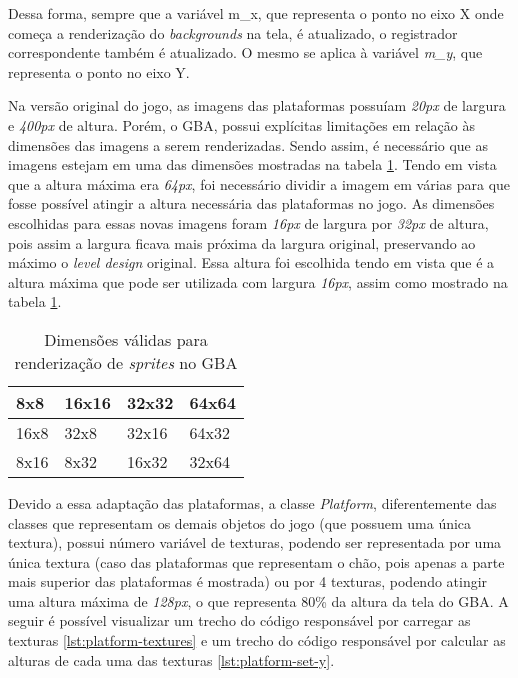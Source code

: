 Dessa forma, sempre que a variável m\_x, que representa o ponto no eixo X onde começa a renderização do \textit{backgrounds} na tela, é atualizado, o registrador correspondente também é atualizado. O mesmo se aplica à variável \textit{m\_y}, que representa o ponto no eixo Y.
 
Na versão original do jogo, as imagens das plataformas possuíam \textit{20px} de largura e \textit {400px} de altura. Porém, o GBA, possui explícitas limitações em relação às dimensões das imagens a serem renderizadas. Sendo assim, é necessário que as imagens estejam em uma das dimensões mostradas na tabela \ref{table:sprite-sizes}. Tendo em vista que a altura máxima era \textit{64px}, foi necessário dividir a imagem em várias para que fosse possível atingir a altura necessária das plataformas no jogo. As dimensões escolhidas para essas novas imagens foram \textit{16px} de largura por \textit{32px} de altura, pois assim a largura ficava mais próxima da largura original, preservando ao máximo o \textit{level design} original. Essa altura foi escolhida tendo em vista que é a altura máxima que pode ser utilizada com largura \textit{16px}, assim como mostrado na tabela \ref{table:sprite-sizes}.

\begin{table}[htb]
\center
\begin{tabular}{|l|l|l|l|}
\hline
8x8  & 16x16 & 32x32 & 64x64 \\ \hline
16x8 & 32x8  & 32x16 & 64x32 \\ \hline
8x16 & 8x32  & 16x32 & 32x64 \\ \hline
\end{tabular}
\caption{Dimensões válidas para renderização de \textit{sprites} no GBA}
\label{table:sprite-sizes}
\end{table}

Devido a essa adaptação das plataformas, a classe \textit{Platform}, diferentemente das classes que representam os demais objetos do jogo (que possuem uma única textura), possui número variável de texturas, podendo ser representada por uma única textura (caso das plataformas que representam o chão, pois apenas a parte mais superior das plataformas é mostrada) ou por 4 texturas, podendo atingir uma altura máxima de \textit{128px}, o que representa 80\% da altura da tela do GBA. A seguir é possível visualizar um trecho do código responsável por carregar as texturas \ref{lst:platform-textures} e um trecho do código responsável por calcular as alturas de cada uma das texturas \ref{lst:platform-set-y}.

